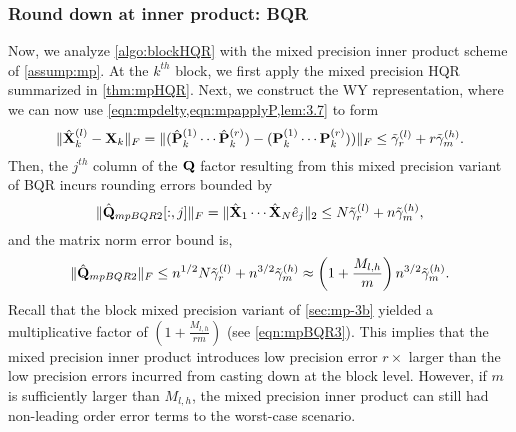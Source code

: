 
\subsubsection{Round down at inner product: BQR}
Now, we analyze \cref{algo:blockHQR} with the mixed precision inner product scheme of \cref{assump:mp}. 
At the $k^{th}$ block, we first apply the mixed precision HQR summarized in \cref{thm:mpHQR}.
Next, we construct the WY representation, where we can now use \cref{eqn:mpdelty,eqn:mpapplyP,lem:3.7} to form
\begin{equation}
	\|\hat{\mathbf{X}}_{k}^{(l)}- \mathbf{X}_k\|_F = \|(\hat{\mathbf{P}}_k^{(1)}\cdots \hat{\mathbf{P}}_k^{(r)})-(\mathbf{P}_k^{(1)}\cdots \mathbf{P}_k^{(r)}))\|_F \leq \tilde{\gamma}_{r}^{(l)} + r\tilde{\gamma}_{m}^{(h)}.
\end{equation}
Then, the $j^{th}$ column of the $\mathbf{Q}$ factor resulting from this mixed precision variant of BQR incurs rounding errors bounded by
\begin{equation}
	\|\hat{\mathbf{Q}}_{mpBQR2}[:,j]\|_F = \|\hat{\mathbf{X}}_1\cdots\hat{\mathbf{X}}_N\hat{e}_j\|_2\leq N\tilde{\gamma}_{r}^{(l)} + n\tilde{\gamma}_{m}^{(h)},
\end{equation}
and the matrix norm error bound is, 
\begin{equation}
	\|\hat{\bb{Q}}_{mpBQR2}\|_F \leq n^{1/2}N\tilde{\gamma}_{r}^{(l)} + n^{3/2}\tilde{\gamma}_{m}^{(h)} \approx \left(1+\frac{M_{l,h}}{m}\right)n^{3/2}\tilde{\gamma}_{m}^{(h)}. \label{eqn:mpBQR2}
\end{equation}
Recall that the block mixed precision variant of \cref{sec:mp-3b} yielded a multiplicative factor of $(1+\frac{M_{l,h}}{rm})$ (see \cref{eqn:mpBQR3}).
This implies that the mixed precision inner product introduces low precision error $r\times $ larger than the low precision errors incurred from casting down at the block level.
However, if $m$ is sufficiently larger than $M_{l,h}$, the mixed precision inner product can still had non-leading order error terms to the worst-case scenario.
